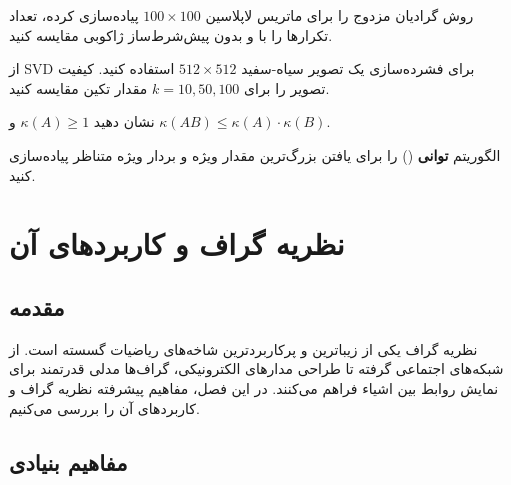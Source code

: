 \documentclass{matinbook}
\begin{document}
    \begin{exercise}
        روش گرادیان مزدوج را برای
        ماتریس لاپلاسین $100 \times 100$
        پیاده‌سازی کرده، تعداد تکرارها
        را با و بدون پیش‌شرط‌ساز ژاکوبی
        مقایسه کنید.
        \label{exc:cg-preconditioner}
    \end{exercise}
    
    \begin{exercise}
        از SVD برای فشرده‌سازی یک تصویر
        سیاه-سفید $512 \times 512$ استفاده کنید.
        کیفیت تصویر را برای $k = 10, 50, 100$
        مقدار تکین مقایسه کنید.
        \label{exc:svd-image}
    \end{exercise}
    
    \begin{exercise}
        نشان دهید $\kappa(A) \geq 1$ و
        $\kappa(AB) \leq \kappa(A) \cdot \kappa(B)$.
        \label{exc:condition-proof}
    \end{exercise}
    
    \begin{exercise}
        الگوریتم \textbf{توانی} ()
        را برای یافتن بزرگ‌ترین مقدار ویژه
        و بردار ویژه متناظر پیاده‌سازی کنید.
        \label{exc:power-method}
    \end{exercise}
    
    
    
    \chapter{نظریه گراف و کاربردهای آن}
    \label{chap:graph-theory}
    
    \section{مقدمه}
    
    نظریه گراف یکی از زیباترین
    و پرکاربردترین شاخه‌های ریاضیات گسسته است.
    از شبکه‌های اجتماعی گرفته تا طراحی مدارهای
    الکترونیکی، گراف‌ها مدلی قدرتمند برای
    نمایش روابط بین اشیاء فراهم می‌کنند.
    در این فصل، مفاهیم پیشرفته نظریه گراف
    و کاربردهای آن را بررسی می‌کنیم.
    
    \section{مفاهیم بنیادی}
    
\end{document}
